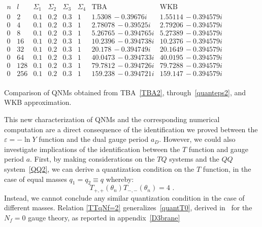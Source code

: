 \documentclass[11pt,a4paper]{elsarticle}
\def \th {\theta}
\newcommand{\be}{\begin{equation}}
\newcommand{\ee}{\end{equation}}
\def\th{\theta}
\numberwithin{figure}{section}
\numberwithin{table}{section}
\begin{document}
\begin{table}[t]
\centering
$\begin{array}{c|c|c|c|c|c|c|c}
 n&l&\Sigma _1 & \Sigma _2 & \Sigma _3 & \Sigma _4 & \text{TBA} & \text{WKB} \\
 \hline
0& 2 &0.1 & 0.2 & 0.3 & 1 &  1.5308\, -0.39676 i & 1.55114\, -0.394579 i \\
0& 4 &  0.1 & 0.2 & 0.3 & 1 &2.78078\, -0.39525 i & 2.79206\, -0.394579 i \\
0&8 & 0.1 & 0.2 & 0.3 & 1 &  5.26765\, -0.394765 i & 5.27389\, -0.394579 i \\
 0&16 &0.1 & 0.2 & 0.3 & 1 &  10.2396\, -0.394738 i & 10.2376\, -0.394579 i \\
0&32 & 0.1 & 0.2 & 0.3 & 1 &  20.178\, -0.394749 i & 20.1649\, -0.394579 i \\
0&64 & 0.1 & 0.2 & 0.3 & 1 &  40.0473\, -0.394733 i & 40.0195\, -0.394579 i \\
0& 128 &0.1 & 0.2 & 0.3 & 1 &  79.7812\, -0.394726 i & 79.7288\, -0.394579 i \\
 0&256 &0.1 & 0.2 & 0.3 & 1 &  159.238\, -0.394721 i & 159.147\, -0.394579 i \\
\end{array}$
\caption{Comparison of QNMs obtained from TBA~\eqref{TBA2}, through~\eqref{quanteps2}, and WKB approximation.}\label{tabQNMsNf=2-case2}
\end{table}



This new characterization of QNMs and the corresponding numerical computation are a direct consequence of the identification we proved between the $\varepsilon = - \ln Y$ function and the dual gauge period $a_D$. However, we could also investigate implications of the identification between the $T$ function and gauge period $a$. First, by making considerations on the $TQ$ systems and the $QQ$ system~\eqref{QQ2}, we can derive a quantization condition on the $T$ function, in the case of equal masses $q_1=q_2\equiv q$ whereby:
\be \label{TTqNf=2}
T_{+,+}(\th_n)T_{-,-}(\th_n) = 4 \, \,.
\ee
Instead, we cannot conclude any similar quantization condition in the case of different masses. Relation \eqref{TTqNf=2} generalizes~\eqref{quantT0}, derived in~\cite{FioravantiGregori:2021} for the $N_f=0$ gauge theory, as reported in appendix~\ref{D3brane}
\end{document}

